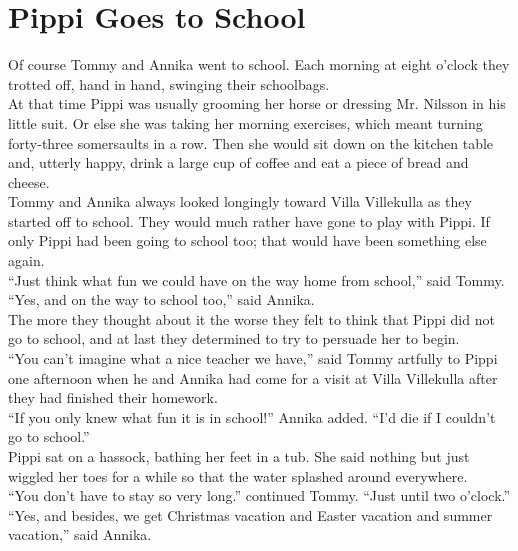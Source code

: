 \documentclass{standard}
\begin{document}
\section{Pippi Goes to School}
Of course Tommy and Annika went to school. Each morning at eight o’clock they trotted off, hand in hand, swinging their schoolbags.\\

At that time Pippi was usually grooming her horse or dressing Mr. Nilsson in his little suit. Or else she was taking her morning exercises, which meant turning forty-three somersaults in a row. Then she would sit down on the kitchen table and, utterly happy, drink a large cup of coffee and eat a piece of bread and cheese.\\

Tommy and Annika always looked longingly toward Villa Villekulla as they started off to school. They would much rather have gone to play with Pippi. If only Pippi had been going to school too; that would have been something else again.\\

“Just think what fun we could have on the way home from school,” said Tommy.\\

“Yes, and on the way to school too,” said Annika.\\

The more they thought about it the worse they felt to think that Pippi did not go to school, and at last they determined to try to persuade her to begin.\\

“You can’t imagine what a nice teacher we have,” said Tommy artfully to Pippi one afternoon when he and Annika had come for a visit at Villa Villekulla after they had finished their homework.\\

“If you only knew what fun it is in school!” Annika added. “I’d die if I couldn’t go to school.”\\

Pippi sat on a hassock, bathing her feet in a tub. She said nothing but just wiggled her toes for a while so that the water splashed around everywhere.\\

“You don’t have to stay so very long.” continued Tommy. “Just until two o’clock.”\\

“Yes, and besides, we get Christmas vacation and Easter vacation and summer vacation,” said Annika.\\
\end{document}
